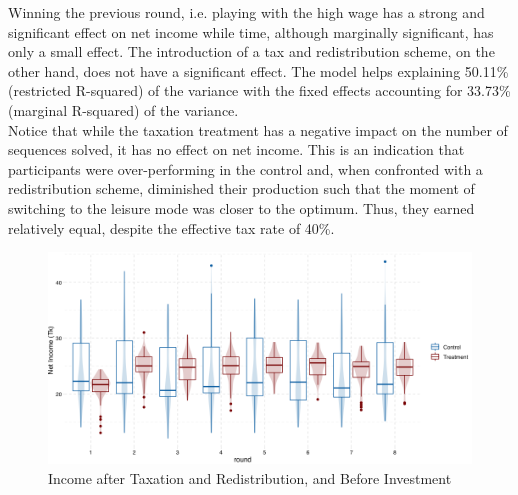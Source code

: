 Winning the previous round, i.e. playing with the high wage has a strong and significant effect on net income while time, although marginally significant, has only a small effect. The introduction of a tax and redistribution scheme, on the other hand, does not have a significant effect. The model helps explaining 50.11\% (restricted R-squared) of the variance with the fixed effects accounting for 33.73\% (marginal R-squared) of the variance.\\

Notice that while the taxation treatment has a negative impact on the number of sequences solved, it has no effect on net income. This is an indication that participants were over-performing in the control and, when confronted with a redistribution scheme, diminished their production such that the moment of switching to the leisure mode was closer to the optimum. Thus, they earned relatively equal, despite the effective tax rate of 40\%.\\

\begin{figure}
    \centering
    \includegraphics[width=\textwidth]{graphs/earnings_boxplot.png}
    \caption{Income after Taxation and Redistribution, and Before Investment}
    \label{fig:earnings_boxplot}
\end{figure}


